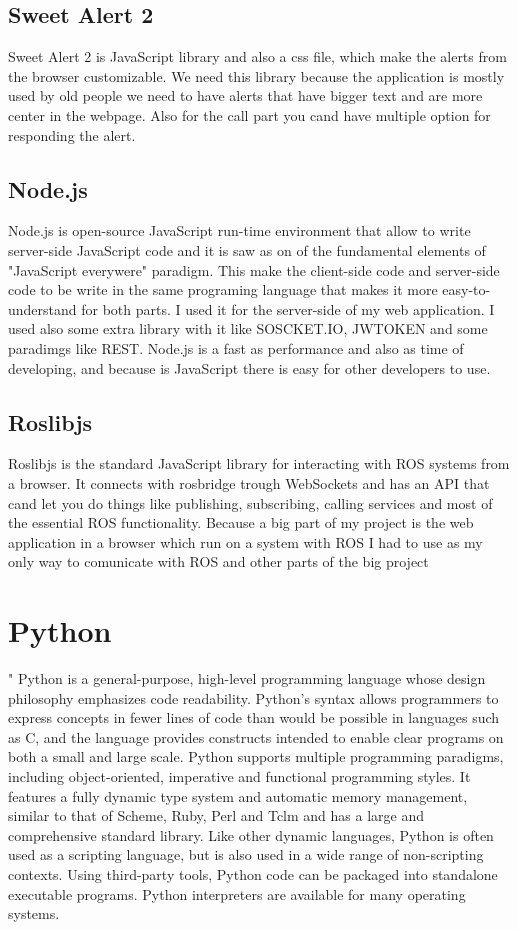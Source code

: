 \subsection{Sweet Alert 2}
\label{sub-sec:javascript-swalert}
Sweet Alert 2 is JavaScript library and also a css file, which make the alerts from
the browser customizable. We need this library because the application is mostly
used by old people we need to have alerts that have bigger text and are more center
in the webpage. Also for the call part you cand have multiple option for responding
the alert.


\subsection{Node.js}
\label{sub-sec:javascript-node}
Node.js is open-source JavaScript run-time environment that allow to write server-side
JavaScript code and it is saw as on of the fundamental elements of "JavaScript everywere"
paradigm. This make the client-side code and server-side code to be write in the same
programing language that makes it more easy-to-understand for both parts. I used it
for the server-side of my web application. I used also some extra library with it like
SOSCKET.IO, JWTOKEN and some paradimgs like REST. Node.js is a fast as performance and
also as time of developing, and because is JavaScript there is easy for other developers
to use.


\subsection{Roslibjs}
\label{sub-sec:javascript-roslib}
Roslibjs is the standard JavaScript library for interacting with ROS systems from
a browser. It connects with rosbridge trough WebSockets and has an API that cand let
you do things like publishing, subscribing, calling services and most of the essential ROS
functionality. Because a big part of my project is the web application in a browser which 
run on a system with ROS I had to use as my only way to comunicate with ROS and other parts
of the big project

\section{Python}
\label{sec:python}
"
Python is a general-purpose, high-level programming language whose design philosophy emphasizes code readability.
Python's syntax allows programmers to express concepts in fewer lines of code than would be possible in languages
such as C, and the language provides constructs intended to enable clear programs on both a small and large
scale.
Python supports multiple programming paradigms, including object-oriented, imperative and functional programming
styles. It features a fully dynamic type system and automatic memory management, similar to that of Scheme, Ruby,
Perl and Tclm and has a large and comprehensive standard library.
Like other dynamic languages, Python is often used as a scripting language, but is also used in a wide range of
non-scripting contexts. Using third-party tools, Python code can be packaged into standalone executable programs.
Python interpreters are available for many operating systems.

